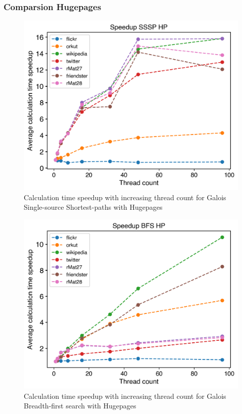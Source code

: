 \subsubsection{Comparsion Hugepages}
\begin{figure}
	\includegraphics[width=\linewidth]{../../plots/singleNodeSSSPGaloisHPThreads.png}
	\caption{Calculation time speedup with increasing thread count for Galois Single-source Shortest-paths with Hugepages}
	\label{fig:galoisHPSpeedupSSSP}
\end{figure}

\begin{figure}
	\includegraphics[width=\linewidth]{../../plots/singleNodeBFSGaloisHPThreads.png}
	\caption{Calculation time speedup with increasing thread count for Galois Breadth-first search with Hugepages}
	\label{fig:galoisHPSpeedupBFS}
\end{figure}

